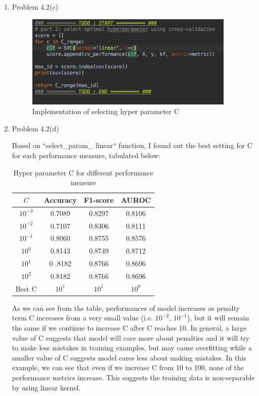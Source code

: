 \documentclass[11pt]{article}
\newcommand{\solution}[1]{{{\color{black}{\bf Solution:} {#1}}}}
\begin{document}
\begin{enumerate}
{}

\vspace{2cm}

\item Problem 4.2(c)

\solution{
	
	\begin{figure}[h!]
	\centering
	\includegraphics[width = 10cm]{42c}
	\caption{Implementation of selecting hyper parameter C}
	\end{figure}
	
}

\vspace{2cm}

\item Problem 4.2(d)

\solution{
	
	Based on ``select\_param\_ linear`` function, I found out the best setting for C for each performance measure, tabulated below:
	
	\begin{table}[h!]
	\caption{Hyper parameter C for different performance measure}
	\begin{center}
 	\begin{tabular}{||c c c c||} 
	 \hline
 	$C$ & Accuracy & F1-score & AUROC \\ [0.5ex] 
 	\hline\hline
 	$10^{-3}$ & 0.7089 & 0.8297 & 0.8106\\ 
 	\hline
 	$10^{-2}$ & 0.7107 & 0.8306 & 0.8111\\
 	\hline
 	$10^{-1}$ & 0.8060 & 0.8755 & 0.8576\\
 	\hline
 	$10^{0}$ & 0.8143 & 0.8749 & 0.8712 \\ 
	\hline
	$10^{1}$ & 0 .8182 &0.8766 & 0.8696\\
	\hline
	$10^{2}$ & 0.8182 & 0.8766 & 0.8696\\
	\hline
	Best C & $10^{1}$ & $10^{1}$ & $10^{0}$\\ [1ex]
	\hline
	\end{tabular}
	\end{center}
	\end{table}
	As we can see from the table, performances of model increases as penalty term C increases from a very small value (i.e. $10^{-2}$, $10^{-1}$), but it will remain the same if we continue to increase C after C reaches 10. In general, a large value of C suggests that model will care more about penalties and it will try to make less mistakes in training examples, but may cause overfitting while a smaller value of C suggests model cares less about making mistakes. In this example, we can see that even if we increase C from 10 to 100, none of the performance metrics increase. This suggests the training data is non-separable by using linear kernel.
}


\end{enumerate}
\end{document}
